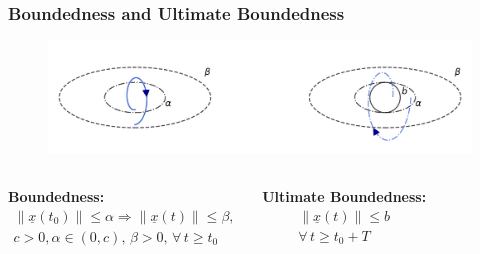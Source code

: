 \documentclass[student, noshadow, lsr, english, aspectratio=169, t]{ITR_LSR_slides}
\begin{document}
\begin{frame}
	\frametitle{Boundedness and Ultimate Boundedness}
	\begin{figure}
		\centering
		\includegraphics[width=\textwidth]{ultimate_boundedness_rotated.pdf}
		\caption{}
		\label{fig:boundedness_vs_ultimate_boundedness}
	\end{figure}
	\vspace{-1cm}
	\begin{columns}[t,totalwidth=\textwidth]
		\textbf{Boundedness:}
		\begin{align*}
			\|\underline{x}(t_0)\| \leq \alpha \Rightarrow \|\underline{x}(t)\| \leq \beta,
			\\ c>0, \alpha\in(0,c),\, \beta>0,\,\forall\, t \geq t_0
		\end{align*}

		\textbf{Ultimate Boundedness:}
		\begin{align*}
			\|\underline{x}(t)\| \leq b 
			\\ \forall\, t \geq t_0+T
		\end{align*}
    \end{columns}
\end{frame}
\end{document}
